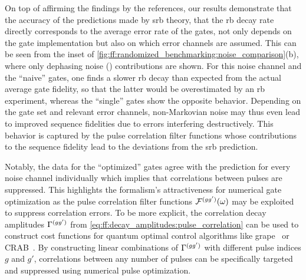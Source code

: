On top of affirming the findings by the references, our results demonstrate that the accuracy of the predictions made by \gls{srb} theory, \ie that the \gls{rb} decay rate directly corresponds to the average error rate of the gates, not only depends on the gate implementation but also on which error channels are assumed.
This can be seen from the inset of \cref{fig:ff:randomized_benchmarking:noise_comparison}(b), where only dephasing noise (\sz) contributions are shown.
For this noise channel and the \enquote{naive} gates, one finds a slower \gls{rb} decay than expected from the actual average gate fidelity, so that the latter would be overestimated by an \gls{rb} experiment, whereas the \enquote{single} gates show the opposite behavior.
Depending on the gate set and relevant error channels, non-Markovian noise may thus even lead to improved sequence fidelities due to errors interfering destructively.
This behavior is captured by the pulse correlation filter functions whose contributions to the sequence fidelity lead to the deviations from the \gls{srb} prediction.

Notably, the data for the \enquote{optimized} gates agree with the prediction for every noise channel individually which implies that correlations between pulses are suppressed.
This highlights the formalism's attractiveness for numerical gate optimization as the pulse correlation filter functions $\mathcal{F}^{(gg^\prime)}(\omega)$ may be exploited to suppress correlation errors.
To be more explicit, the correlation decay amplitudes $\Gamma^{(gg^\prime)}$ from \cref{eq:ff:decay_amplitudes:pulse_correlation} can be used to construct cost functions for quantum optimal control algorithms like \gls{grape}~\cite{Khaneja2005,Schulte-Herbruggen2005} or CRAB~\cite{Caneva2011}.
By constructing linear combinations of $\Gamma^{(gg')}$ with different pulse indices $g$ and $g'$, correlations between any number of pulses can be specifically targeted and suppressed using numerical pulse optimization.

